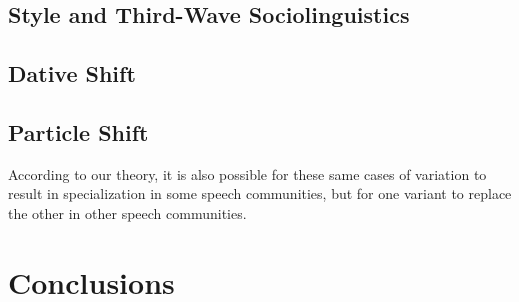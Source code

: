 \subsection{Style and Third-Wave Sociolinguistics}





\subsection{Dative Shift}

\subsection{Particle Shift}


According to our theory, it is also possible for these same cases of variation to result in specialization in some speech communities, but for one variant to replace the other in other speech communities.

\section{Conclusions}




